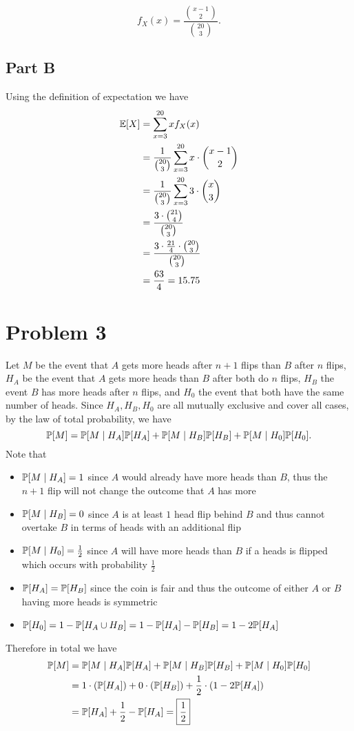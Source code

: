 \documentclass{eeleyes}
\begin{document}
\[
    f_X(x) = \frac{\binom{x - 1}{2}}{\binom{20}{3}}
.\]

\subsection*{Part B}
Using the definition of expectation we have
\begin{align*}
    \mathbb{E}\qty[X] &= \sum_{x=3}^{20} x f_X(x) \\
             &= \frac{1}{\binom{20}{3}} \sum_{x=3}^{20} x \cdot \binom{x-1}{2} \\
             &= \frac{1}{\binom{20}{3}} \sum_{x=3}^{20} 3 \cdot \binom{x}{3} \\
             &= \frac{3 \cdot \binom{21}{4}}{\binom{20}{3}} \\
             &= \frac{3 \cdot \frac{21}{4} \cdot \binom{20}{3}}{\binom{20}{3}} \\
             &= \frac{63}{4} = 15.75
\end{align*}

\section*{Problem 3}
Let $M$ be the event that $A$ gets more heads after $n+1$ flips than $B$ after $n$ flips, $H_A$ be the event that $A$ gets more heads than $B$ after both do $n$ flips, $H_B$ the event $B$ has more heads after $n$ flips, and $H_0$ the event that both have the same number of heads. Since $H_A, H_B, H_0$ are all mutually exclusive and cover all cases, by the law of total probability, we have
\[
    \mathbb{P}\qty[M] = \mathbb{P}\qty[M \mid H_A] \mathbb{P}\qty[H_A] + \mathbb{P}\qty[M \mid H_B] \mathbb{P}\qty[H_B] + \mathbb{P}\qty[M \mid H_0] \mathbb{P}\qty[H_0]
.\]
Note that
\begin{itemize}
    \item $\mathbb{P}\qty[M \mid H_A] = 1$ since $A$ would already have more heads than $B$, thus the $n+1$ flip will not change the outcome that $A$ has more
    \item $\mathbb{P}\qty[M \mid H_B] = 0$ since $A$ is at least $1$ head flip behind $B$ and thus cannot overtake $B$ in terms of heads with an additional flip
    \item $\mathbb{P}\qty[M \mid H_0] = \frac{1}{2}$ since $A$ will have more heads than $B$ if a heads is flipped which occurs with probability $\frac{1}{2}$
    \item $\mathbb{P}\qty[H_A] = \mathbb{P}\qty[H_B]$ since the coin is fair and thus the outcome of either $A$ or $B$ having more heads is symmetric
    \item $\mathbb{P}\qty[H_0] = 1 - \mathbb{P}\qty[H_A \cup H_B] = 1 - \mathbb{P}\qty[H_A] - \mathbb{P}\qty[H_B] = 1 - 2 \mathbb{P}\qty[H_A]$
\end{itemize}
Therefore in total we have
\begin{align*}
    \mathbb{P}\qty[M] &= \mathbb{P}\qty[M \mid H_A] \mathbb{P}\qty[H_A] + \mathbb{P}\qty[M \mid H_B] \mathbb{P}\qty[H_B] + \mathbb{P}\qty[M \mid H_0] \mathbb{P}\qty[H_0] \\
             &= 1\cdot(\mathbb{P}\qty[H_A]) + 0 \cdot(\mathbb{P}\qty[H_B]) + \frac{1}{2} \cdot (1 - 2\mathbb{P}\qty[H_A]) \\
             &= \mathbb{P}\qty[H_A] + \frac{1}{2} - \mathbb{P}\qty[H_A] = \boxed{\frac{1}{2}}
\end{align*}
\end{document}
